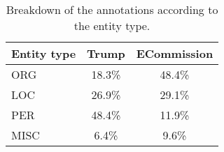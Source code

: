 \documentclass[11pt]{article}
\begin{document}
\begin{table}
  \begin{center}
    \begin{footnotesize}
      \begin{tabular}{lcc}
        \toprule 
        Entity type & {\textbf{{\sc Trump}}} & {\textbf{{\sc ECommission}}} \\
        \midrule
        ORG & 18.3\% & 48.4\% \\
        LOC & 26.9\% & 29.1\% \\
        PER & 48.4\% & 11.9\% \\
        MISC & 6.4\% & 9.6\% \\
        \bottomrule
      \end{tabular}
    \end{footnotesize}
  \end{center}
  \caption{Breakdown of the annotations according to the entity type.}
  \label{tab:datasets-2}
\end{table}
\end{document}
